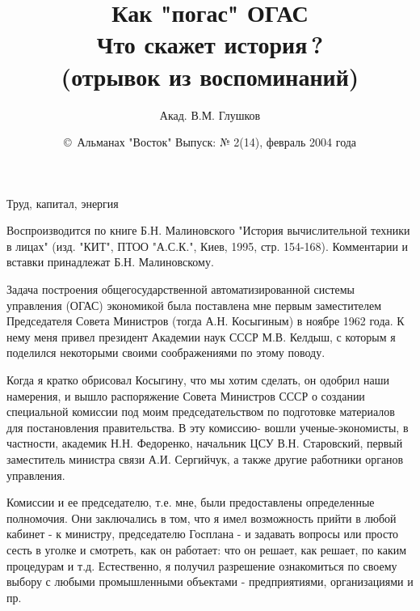 

\title{Как "погас" ОГАС\\Что скажет история\,?\\(отрывок из воспоминаний)}
\author{Акад. В.М. Глушков} 
\date{\copyright\ Альманах "Восток" Выпуск: № 2(14), февраль 2004 года}

\maketitle

Труд, капитал, энергия
\bigskip
 
Воспроизводится по книге
Б.Н. Малиновского "История вычислительной техники в лицах"
(изд. "КИТ", ПТОО "А.С.К.", Киев, 1995, стр. 154-168).
Комментарии и вставки принадлежат Б.Н. Малиновскому.
\bigskip

Задача построения общегосударственной автоматизированной системы управления
(ОГАС) экономикой была поставлена мне первым заместителем Председателя Совета
Министров (тогда А.Н. Косыгиным) в ноябре 1962 года. К нему меня привел
президент Академии наук СССР М.В. Келдыш, с которым я поделился некоторыми
своими соображениями по этому поводу.

Когда я кратко обрисовал Косыгину, что мы хотим сделать, он одобрил наши
намерения, и вышло распоряжение Совета Министров СССР о создании специальной
комиссии под моим председательством по подготовке материалов для постановления
правительства. В эту комиссию- вошли ученые-экономисты, в частности, академик
Н.Н. Федоренко, начальник ЦСУ В.Н. Старовский, первый заместитель министра связи
А.И. Сергийчук, а также другие работники органов управления.

Комиссии и ее председателю, т.е. мне, были предоставлены определенные
полномочия. Они заключались в том, что я имел возможность прийти в любой кабинет
- к министру, председателю Госплана - и задавать вопросы или просто сесть в
уголке и смотреть, как он работает: что он решает, как решает, по каким
процедурам и т.д. Естественно, я получил разрешение ознакомиться по своему
выбору с любыми промышленными объектами - предприятиями, организациями и пр.

